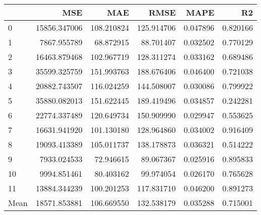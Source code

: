 \begin{tabular}{lrrrrr}
\toprule
 & MSE & MAE & RMSE & MAPE & R2 \\
\midrule
0 & 15856.347006 & 108.210824 & 125.914706 & 0.047896 & 0.820166 \\
1 & 7867.955789 & 68.872915 & 88.701407 & 0.032502 & 0.770129 \\
2 & 16463.879468 & 102.967719 & 128.311274 & 0.033162 & 0.689486 \\
3 & 35599.325759 & 151.993763 & 188.676406 & 0.046400 & 0.721038 \\
4 & 20882.743507 & 116.024259 & 144.508007 & 0.030086 & 0.799922 \\
5 & 35880.082013 & 151.622445 & 189.419496 & 0.034857 & 0.242281 \\
6 & 22774.337489 & 120.649734 & 150.909990 & 0.029947 & 0.553625 \\
7 & 16631.941920 & 101.130180 & 128.964860 & 0.034002 & 0.916409 \\
8 & 19093.413389 & 105.011737 & 138.178873 & 0.036321 & 0.514222 \\
9 & 7933.024533 & 72.946615 & 89.067367 & 0.025916 & 0.895833 \\
10 & 9994.851461 & 80.403162 & 99.974054 & 0.026170 & 0.765628 \\
11 & 13884.344239 & 100.201253 & 117.831710 & 0.046200 & 0.891273 \\
Mean & 18571.853881 & 106.669550 & 132.538179 & 0.035288 & 0.715001 \\
\bottomrule
\end{tabular}
